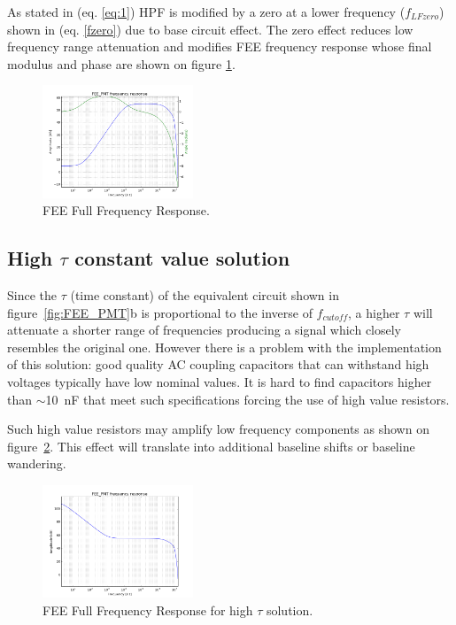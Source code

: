\documentclass[a4paper, 10pt, oneside, twocolumn, 3p]{elsarticle}
\begin{document}
\par As stated in (eq. \ref{eq:1}) HPF is modified by a zero at a lower frequency  ($f_{LFzero}$) shown in (eq. \ref{fzero}) due to base circuit effect. The zero effect reduces low frequency range attenuation and modifies FEE frequency response whose final modulus and phase are shown on figure \ref{fig:Full_Freq}.


\begin{figure}
	\begin{center}
		\includegraphics[width=0.4\textwidth]{./figures/FEEfull_freq.png}
		\caption{FEE Full Frequency Response.}
		\label{fig:Full_Freq}
	\end{center}
\end{figure}


\subsection {High $\tau$ constant value solution}

Since the $\tau$ (time constant) of the equivalent circuit shown in figure~\ref{fig:FEE_PMT}b is proportional to the inverse of $f_{cutoff}$, a higher $\tau$ will attenuate a shorter range of frequencies producing a signal which closely resembles the original one. However there is a problem with the implementation of this solution: good quality AC coupling capacitors that can withstand high voltages typically have low nominal values. It is hard to find capacitors higher than $\sim$10~nF that meet such specifications forcing the use of high value resistors. 

Such high value resistors may amplify low frequency components as shown on figure~\ref{fig:Full_Freq_high_tau}. This effect will translate into additional baseline shifts or baseline wandering. 

\begin{figure}
	\begin{center}
		\includegraphics[width=0.4\textwidth]{./figures/tau_badidea.png}
		\caption{FEE Full Frequency Response for high $\tau$ solution.}
		\label{fig:Full_Freq_high_tau}
	\end{center}
\end{figure}
\end{document}
